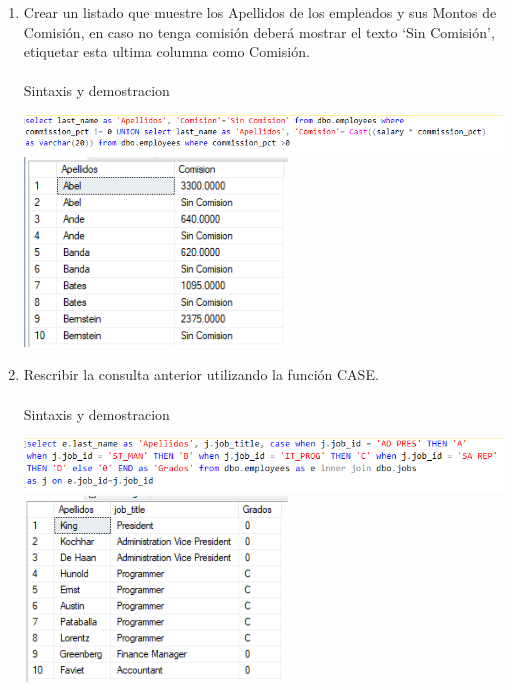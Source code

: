 \begin{enumerate}[1.]
	\item Crear un listado que muestre los Apellidos de los empleados y sus Montos de Comisi\'on, en caso no tenga comisi\'on deber\'a mostrar el texto ‘Sin Comisi\'on’, etiquetar esta ultima columna como Comisi\'on.
	\\
	\\Sintaxis y demostracion
	\begin{center}
	\includegraphics[width=16cm]{./Imagenes/64}
	\includegraphics[width=7cm]{./Imagenes/642}
	\end{center}


	\item Rescribir la consulta anterior utilizando la función CASE.
	\\
	\\Sintaxis y demostracion
	\begin{center}
	\includegraphics[width=16cm]{./Imagenes/66}
	\includegraphics[width=7cm]{./Imagenes/662}
	\end{center}

\end{enumerate}


